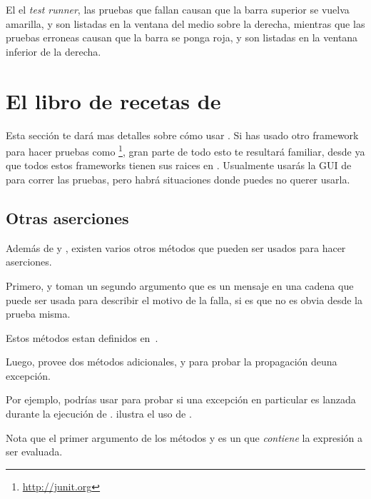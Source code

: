 \documentclass[a4paper,10pt,twoside]{book}
\begin{document}
El el \emph{test runner}, las pruebas que fallan causan que la barra superior se vuelva amarilla, 
y son listadas en la ventana del medio sobre la derecha, mientras que
las pruebas erroneas causan que la barra se ponga roja, y son listadas en la ventana inferior de la derecha.


\section{El libro de recetas de \SUnit }

Esta secci\'on te dar\'a mas detalles sobre c\'omo usar \SUnit.  Si has usado
otro framework para hacer pruebas como \Junit\footnote{\url{http://junit.org}},
gran parte de todo esto te resultar\'a familiar, desde ya que todos estos frameworks tienen
sus raices en \SUnit.
Usualmente usar\'as la GUI de \SUnit para correr las pruebas, pero 
habr\'a situaciones donde puedes no querer usarla.


\subsection{Otras aserciones}
Adem\'as de  y , existen varios otros m\'etodos que pueden
ser usados para hacer aserciones.

Primero,  y  toman un segundo
argumento que es un mensaje en una cadena que puede ser usada para describir el motivo de la falla,
si es que no es obvia desde la prueba misma.

Estos m\'etodos estan definidos en~.

Luego, \sunit provee dos m\'etodos adicionales,  y 
para probar la propagaci\'on deuna excepci\'on. 

Por ejemplo, podr\'ias usar 
para probar si una excepci\'on en particular es lanzada durante la
ejecuci\'on de .  ilustra el uso de \mbox{.}



Nota que el primer argumento de los m\'etodos  y  es un
 que \emph{contiene} la expresi\'on a ser evaluada.
\end{document}
